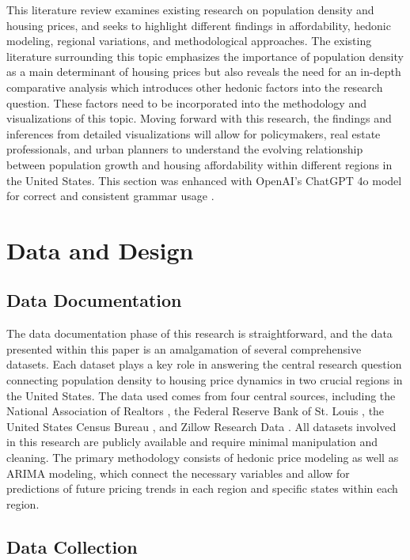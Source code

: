 \documentclass[journal,article,submit,pdftex,moreauthors]{Definitions/mdpi}
\begin{document}
This literature review examines existing research on population density and housing prices, and seeks to highlight different findings in affordability, hedonic modeling, regional variations, and methodological approaches. The existing literature surrounding this topic emphasizes the importance of population density as a main determinant of housing prices but also reveals the need for an in-depth comparative analysis which introduces other hedonic factors into the research question. These factors need to be incorporated into the methodology and visualizations of this topic. Moving forward with this research, the findings and inferences from detailed visualizations will allow for policymakers, real estate professionals, and urban planners to understand the evolving relationship between population growth and housing affordability within different regions in the United States. This section was enhanced with OpenAI’s ChatGPT 4o model for correct and consistent grammar usage \citep{openai_2025_chatgpt}.

\section{Data and Design}

\subsection{Data Documentation}

The data documentation phase of this research is straightforward, and the data presented within this paper is an amalgamation of several comprehensive datasets. Each dataset plays a key role in answering the central research question connecting population density to housing price dynamics in two crucial regions in the United States. The data used comes from four central sources, including the National Association of Realtors \citep{_2024_county}, the Federal Reserve Bank of St. Louis \citep{a2024_hpi}, the United States Census Bureau \citep{_2024_state}, and Zillow Research Data \citep{zillow_2024_housing}. All datasets involved in this research are publicly available and require minimal manipulation and cleaning. The primary methodology consists of hedonic price modeling as well as ARIMA modeling, which connect the necessary variables and allow for predictions of future pricing trends in each region and specific states within each region.

\subsection{Data Collection}
\end{document}
